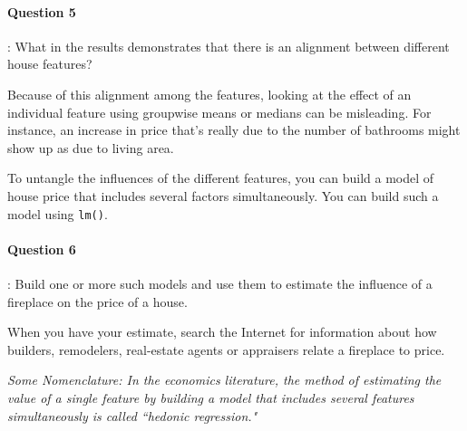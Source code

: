 \documentclass{article}\usepackage[]{graphicx}\usepackage[]{color}
\begin{document}
\begin{multicols}{2}
\paragraph{Question 5}: What in the results demonstrates that there is an alignment between different house features?

\bigskip

Because of this alignment among the features, looking at the effect of an individual feature using groupwise means or medians can be misleading.  For instance, an increase in price that's really due to the number of bathrooms might show up as due to living area.

To untangle the influences of the different features, you can build a model of house price that includes several factors simultaneously.  You can build such a model using \texttt{lm()}.

\bigskip

\paragraph{Question 6}: Build one or more such models and use them to estimate the influence of a fireplace on the price of a house.

\bigskip

When you have your estimate, search the Internet for information about how builders, remodelers, real-estate agents or appraisers relate a fireplace to price.

\medskip 
{\em Some Nomenclature: In the economics literature, the method of estimating the value of a single feature by building a model that includes several features simultaneously is called ``hedonic regression."}

\end{multicols}
\end{document}
